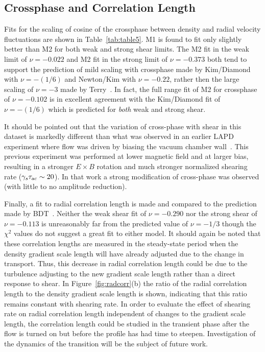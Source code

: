 \documentclass[aip,pop,amsmath,amssymb,preprint,superscriptaddress]{revtex4-1} %
\begin{document}
\subsection{Crossphase and Correlation Length}

Fits for the scaling of cosine of the crossphase between density and radial velocity fluctuations are shown in Table~\ref{tab:table5}. M1 is found to fit only slightly better than M2 for both weak and strong shear limits. The M2 fit in the weak limit of $\nu = -0.022$ and M2 fit in the strong limit of $\nu = -0.373$ both tend to support the prediction of mild scaling with crossphase made by Kim/Diamond with $\nu = -(1/6)$ and Newton/Kim with $\nu = -0.22$, rather then the large scaling of $\nu = -3$ made by Terry~\cite{terry01}. In fact, the full range fit of M2 for crossphase of $\nu = -0.102$ is in excellent agreement with the Kim/Diamond fit of $\nu = -(1/6)$ which is predicted for \textit{both} weak and strong shear.

It should be pointed out that the variation of cross-phase with shear
in this dataset is markedly different than what was observed in an
earlier LAPD experiment where flow was driven by biasing the vacuum
chamber wall~\cite{carter09}.  This previous experiment was performed
at lower magnetic field and at larger bias, resulting in a stronger
$E\times B$ rotation and much stronger normalized shearing rate ($\gamma_s\tau_{\rm ac} \sim 20$).  In that work a strong modification of cross-phase was observed (with little to no amplitude reduction).  

Finally, a fit to radial correlation length is made and compared to the prediction made by BDT~\cite{biglari90}. Neither the weak shear fit of $\nu = -0.290$ nor the strong shear of $\nu = -0.113$ is unreasonably far from the predicted value of $\nu = -1/3$ though the $\chi^{2}$ values do not suggest a great fit to either model. It should again be noted that these correlation lengths are measured in the steady-state period when the density gradient scale length will have already adjusted due to the change in transport. Thus, this decrease in radial correlation length could be due to the turbulence adjusting to the new gradient scale length rather than a direct response to shear.  In Figure~\ref{fig:radcorr}(b) the ratio of the radial correlation length to the density gradient scale length is shown, indicating that this ratio remains constant with shearing rate. In order to evaluate the effect of shearing rate on radial correlation length independent of changes to the gradient scale length, the correlation length could be studied in the transient phase after the flow is turned on but before the profile has had time to steepen. Investigation of the dynamics of the transition will be the subject of future work. 
\end{document}
